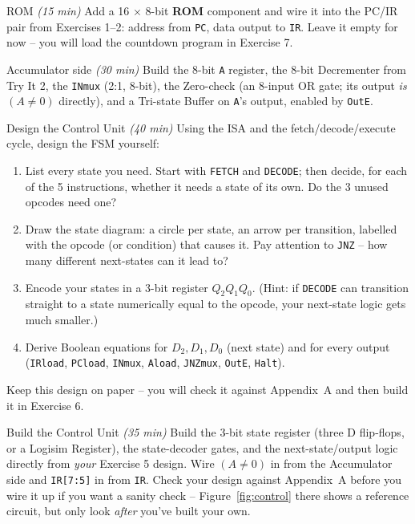 \documentclass[11pt]{article}
\begin{document}
\begin{labexercise}{ROM \hfill {\small \itshape (15 min)}}
Add a 16 $\times$ 8-bit \textbf{ROM} component and wire it into the PC/IR pair from
Exercises 1--2: address from \texttt{PC}, data output to \texttt{IR}. Leave it
empty for now -- you will load the countdown program in Exercise 7.
\end{labexercise}

\begin{labexercise}{Accumulator side \hfill {\small \itshape (30 min)}}
Build the 8-bit \texttt{A} register, the 8-bit Decrementer from Try It 2, the
\texttt{INmux} (2:1, 8-bit), the Zero-check (an 8-input OR gate; its output
\emph{is} $(A \neq 0)$ directly), and a Tri-state Buffer on \texttt{A}'s output,
enabled by \texttt{OutE}.
\end{labexercise}

\begin{labexercise}{Design the Control Unit \hfill {\small \itshape (40 min)}}
Using the ISA and the fetch/decode/execute cycle, design the FSM yourself:
\begin{enumerate}[nosep,leftmargin=*]
  \item List every state you need. Start with \texttt{FETCH} and \texttt{DECODE};
        then decide, for each of the 5 instructions, whether it needs a state of
        its own. Do the 3 unused opcodes need one?
  \item Draw the state diagram: a circle per state, an arrow per transition,
        labelled with the opcode (or condition) that causes it. Pay attention to
        \texttt{JNZ} -- how many different next-states can it lead to?
  \item Encode your states in a 3-bit register $Q_2Q_1Q_0$. (Hint: if
        \texttt{DECODE} can transition straight to a state numerically equal to
        the opcode, your next-state logic gets much smaller.)
  \item Derive Boolean equations for $D_2, D_1, D_0$ (next state) and for every
        output (\texttt{IRload}, \texttt{PCload}, \texttt{INmux}, \texttt{Aload},
        \texttt{JNZmux}, \texttt{OutE}, \texttt{Halt}).
\end{enumerate}
Keep this design on paper -- you will check it against Appendix~A and then build it
in Exercise 6.
\end{labexercise}

\begin{labexercise}{Build the Control Unit \hfill {\small \itshape (35 min)}}
Build the 3-bit state register (three D flip-flops, or a Logisim Register), the
state-decoder gates, and the next-state/output logic directly from \emph{your}
Exercise 5 design. Wire $(A\neq0)$ in from the Accumulator side and
\texttt{IR[7:5]} in from \texttt{IR}. Check your design against Appendix~A before
you wire it up if you want a sanity check -- Figure~\ref{fig:control} there shows
a reference circuit, but only look \emph{after} you've built your own.
\end{labexercise}
\end{document}
